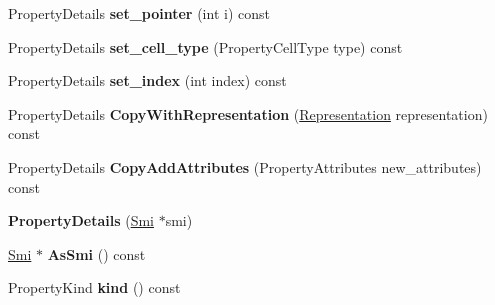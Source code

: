 \begin{DoxyCompactItemize}
\item 
Property\+Details {\bfseries set\+\_\+pointer} (int i) const \hypertarget{classv8_1_1internal_1_1_b_a_s_e___e_m_b_e_d_d_e_d_a27327553d5571be23dcd274d6f88b26b}{}\label{classv8_1_1internal_1_1_b_a_s_e___e_m_b_e_d_d_e_d_a27327553d5571be23dcd274d6f88b26b}

\item 
Property\+Details {\bfseries set\+\_\+cell\+\_\+type} (Property\+Cell\+Type type) const \hypertarget{classv8_1_1internal_1_1_b_a_s_e___e_m_b_e_d_d_e_d_a99f2f6b60f795fb31fc0cbe515e7b833}{}\label{classv8_1_1internal_1_1_b_a_s_e___e_m_b_e_d_d_e_d_a99f2f6b60f795fb31fc0cbe515e7b833}

\item 
Property\+Details {\bfseries set\+\_\+index} (int index) const \hypertarget{classv8_1_1internal_1_1_b_a_s_e___e_m_b_e_d_d_e_d_ac08a3b3a40158f848c7db379fbf9b94b}{}\label{classv8_1_1internal_1_1_b_a_s_e___e_m_b_e_d_d_e_d_ac08a3b3a40158f848c7db379fbf9b94b}

\item 
Property\+Details {\bfseries Copy\+With\+Representation} (\hyperlink{classv8_1_1internal_1_1_representation}{Representation} representation) const \hypertarget{classv8_1_1internal_1_1_b_a_s_e___e_m_b_e_d_d_e_d_a4be9acae1e8d359800aecedac0846cfa}{}\label{classv8_1_1internal_1_1_b_a_s_e___e_m_b_e_d_d_e_d_a4be9acae1e8d359800aecedac0846cfa}

\item 
Property\+Details {\bfseries Copy\+Add\+Attributes} (Property\+Attributes new\+\_\+attributes) const \hypertarget{classv8_1_1internal_1_1_b_a_s_e___e_m_b_e_d_d_e_d_a4ea3e4005b035057a709d58aa19ff817}{}\label{classv8_1_1internal_1_1_b_a_s_e___e_m_b_e_d_d_e_d_a4ea3e4005b035057a709d58aa19ff817}

\item 
{\bfseries Property\+Details} (\hyperlink{classv8_1_1internal_1_1_smi}{Smi} $\ast$smi)\hypertarget{classv8_1_1internal_1_1_b_a_s_e___e_m_b_e_d_d_e_d_a42798d4634cfedb011bc7cd128de09e9}{}\label{classv8_1_1internal_1_1_b_a_s_e___e_m_b_e_d_d_e_d_a42798d4634cfedb011bc7cd128de09e9}

\item 
\hyperlink{classv8_1_1internal_1_1_smi}{Smi} $\ast$ {\bfseries As\+Smi} () const \hypertarget{classv8_1_1internal_1_1_b_a_s_e___e_m_b_e_d_d_e_d_a9d5771d9fc94ccc3193c505b5f7a8080}{}\label{classv8_1_1internal_1_1_b_a_s_e___e_m_b_e_d_d_e_d_a9d5771d9fc94ccc3193c505b5f7a8080}

\item 
Property\+Kind {\bfseries kind} () const \hypertarget{classv8_1_1internal_1_1_b_a_s_e___e_m_b_e_d_d_e_d_a511fed58e64228b21f6a461b0a8de300}{}\label{classv8_1_1internal_1_1_b_a_s_e___e_m_b_e_d_d_e_d_a511fed58e64228b21f6a461b0a8de300}


\end{DoxyCompactItemize}
